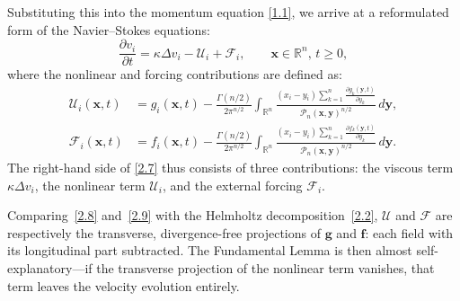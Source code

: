 \documentclass[11pt]{jfm}
\numberwithin{equation}{section}
\begin{document}
Substituting this into the momentum equation \eqref{1.1}, we arrive at a reformulated form of the Navier--Stokes equations:
\begin{equation}
\label{2.7}
\frac{\partial v_i}{\partial t} = \kappa \Delta v_i - \mathcal{U}_i + \mathcal{F}_i, \qquad \boldsymbol{x} \in \mathbb{R}^n, \, t \geq 0,
\end{equation}
where the nonlinear and forcing contributions are defined as:
\begin{align}
\label{2.8}
\mathcal{U}_i(\boldsymbol{x}, t) &= g_i(\boldsymbol{x}, t) - \frac{ \Gamma(n/2) }{ 2\pi^{n/2} } \int_{\mathbb{R}^n} \frac{ (x_i - y_i) \sum_{k=1}^n \frac{\partial g_k(\boldsymbol{y}, t)}{\partial y_k} }{ \mathcal{P}_n(\boldsymbol{x}, \boldsymbol{y})^{n/2} } \, d\boldsymbol{y}, \\
\label{2.9}
\mathcal{F}_i(\boldsymbol{x}, t) &= f_i(\boldsymbol{x}, t) - \frac{ \Gamma(n/2) }{ 2\pi^{n/2} } \int_{\mathbb{R}^n} \frac{ (x_i - y_i) \sum_{k=1}^n \frac{\partial f_k(\boldsymbol{y}, t)}{\partial y_k} }{ \mathcal{P}_n(\boldsymbol{x}, \boldsymbol{y})^{n/2} } \, d\boldsymbol{y}.
\end{align}
The right-hand side of \eqref{2.7} thus consists of three contributions: the viscous term \( \kappa \Delta v_i \), the nonlinear term \( \mathcal{U}_i \), and the external forcing \( \mathcal{F}_i \).

Comparing~\eqref{2.8} and~\eqref{2.9} with the Helmholtz decomposition~\eqref{2.2},
$\boldsymbol{\mathcal{U}}$ and $\boldsymbol{\mathcal{F}}$ are respectively the transverse,
divergence-free projections of $\boldsymbol{g}$ and $\boldsymbol{f}$: each field with its
longitudinal part subtracted. The Fundamental Lemma is then almost self-explanatory---if the
transverse projection of the nonlinear term vanishes, that term leaves the velocity evolution
entirely.
\end{document}
